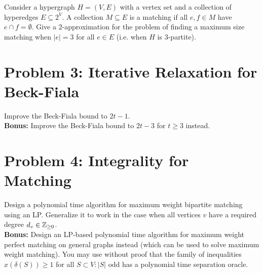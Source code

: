 Consider a hypergraph $H=(V,E)$ with a vertex set and a collection of hyperedges $E \subseteq 2^V$. A collection $M \subseteq E$ is a matching if all $e,f \in M$ have $e \cap f = \emptyset$. Give a 2-approximation for the problem of finding a maximum size matching when $|e| = 3$ for all $e \in E$ (i.e. when $H$ is 3-partite).

\section{Problem 3: Iterative Relaxation for Beck-Fiala}

Improve the Beck-Fiala bound to $2t-1$. \\

\noindent \textbf{Bonus:} Improve the Beck-Fiala bound to $2t-3$ for $t \ge 3$ instead. 

\section{Problem 4: Integrality for Matching}

Design a polynomial time algorithm for maximum weight bipartite matching using an LP. Generalize it to work in the case when all vertices $v$ have a required degree $d_v \in \mathbb Z_{\ge 0}$. \\

\noindent \textbf{Bonus:} Design an LP-based polynomial time algorithm for maximum weight perfect matching on general graphs instead (which can be used to solve maximum weight matching). You may use without proof that the family of inequalities $x(\delta(S)) \ge 1$ for all $S \subset V: |S| \text{ odd}$ has a polynomial time separation oracle. 



%
%


